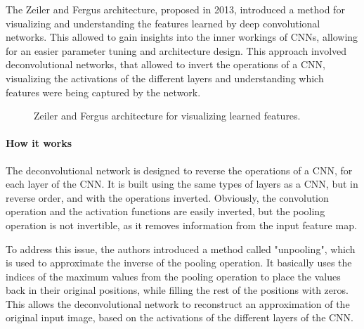 The Zeiler and Fergus architecture, proposed in 2013, introduced a method for visualizing and understanding the features learned by deep convolutional networks.
This allowed to gain insights into the inner workings of CNNs, allowing for an easier parameter tuning and architecture design.
This approach involved deconvolutional networks, that allowed to invert the operations of a CNN, visualizing the activations of the different layers and understanding which features were being captured by the network.
\begin{figure}[H]
    \centering
    
    \caption{Zeiler and Fergus architecture for visualizing learned features.}
    \label{fig:deconvolutionalNN}
\end{figure}
\paragraph{How it works}
The deconvolutional network is designed to reverse the operations of a CNN, for each layer of the CNN. 
It is built using the same types of layers as a CNN, but in reverse order, and with the operations inverted.
Obviously, the convolution operation and the activation functions are easily inverted, but the pooling operation 
is not invertible, as it removes information from the input feature map.

To address this issue, the authors introduced a method called "unpooling", which is used to approximate the inverse of the pooling operation.
It basically uses the indices of the maximum values from the pooling operation to place the values back in their original positions, while filling the rest of the positions with zeros.
This allows the deconvolutional network to reconstruct an approximation of the original input image, based on the activations of the different layers of the CNN.

